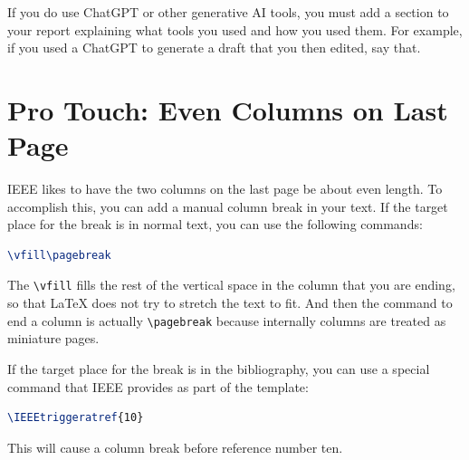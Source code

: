 \documentclass[
	conference,	%
]{IEEEtran}
\begin{document}
If you do use ChatGPT or other generative AI tools,
you must add a section to your report explaining what tools you used and
how you used them.
For example, if you used a ChatGPT to generate a draft that you then edited,
say that.


\section{Pro Touch: Even Columns on Last Page}

IEEE likes to have the two columns on the last page be about even length.
To accomplish this, you can add a manual column break in your text.
If the target place for the break is in normal text,
you can use the following commands:

\begin{lstlisting}[language=tex,numbers=none]
\vfill\pagebreak
\end{lstlisting}

The \lstinline!\vfill! fills the rest of the vertical space in the column
that you are ending,
so that {\LaTeX} does not try to stretch the text to fit.
And then the command to end a column is actually \lstinline!\pagebreak!
because internally columns are treated as miniature pages.

If the target place for the break is in the bibliography,
you can use a special command that IEEE provides as part of the template:

\begin{lstlisting}[language=tex,numbers=none]
\IEEEtriggeratref{10}
\end{lstlisting}

This will cause a column break before reference number ten.
\end{document}
